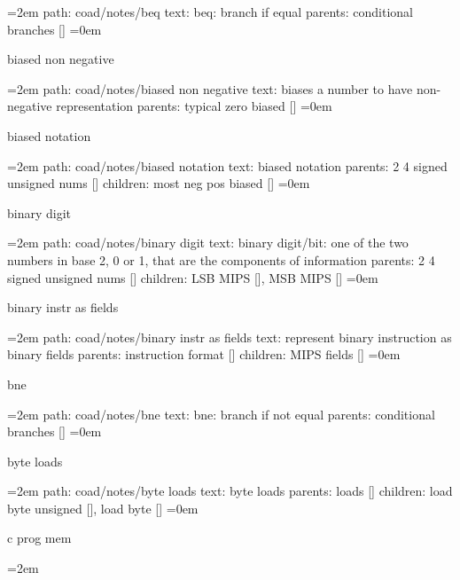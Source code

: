 \leftskip=2em
path: coad/notes/beq
\smallskip
text:  beq: branch if equal
\smallskip
parents:  conditional branches []
\smallskip
\leftskip=0em
\par\endgroup
\bigskip
{}
biased non negative
\smallskip
\par\begingroup
\leftskip=2em
path: coad/notes/biased non negative
\smallskip
text:  biases a number to have non-negative representation
\smallskip
parents:  typical zero biased []
\smallskip
\leftskip=0em
\par\endgroup
\bigskip
{}
biased notation
\smallskip
\par\begingroup
\leftskip=2em
path: coad/notes/biased notation
\smallskip
text:  biased notation
\smallskip
parents:  2 4 signed unsigned nums []
\smallskip
children: most neg pos biased []
\smallskip
\leftskip=0em
\par\endgroup
\bigskip
{}
binary digit
\smallskip
\par\begingroup
\leftskip=2em
path: coad/notes/binary digit
\smallskip
text:  binary digit/bit: one of the two numbers in base 2, 0 or 1, that are the components of information
\smallskip
parents:  2 4 signed unsigned nums []
\smallskip
children: LSB MIPS [], MSB MIPS []
\smallskip
\leftskip=0em
\par\endgroup
\bigskip
{}
binary instr as fields
\smallskip
\par\begingroup
\leftskip=2em
path: coad/notes/binary instr as fields
\smallskip
text:  represent binary instruction as binary fields
\smallskip
parents:  instruction format []
\smallskip
children: MIPS fields []
\smallskip
\leftskip=0em
\par\endgroup
\bigskip
{}
bne
\smallskip
\par\begingroup
\leftskip=2em
path: coad/notes/bne
\smallskip
text:  bne: branch if not equal
\smallskip
parents:  conditional branches []
\smallskip
\leftskip=0em
\par\endgroup
\bigskip
{}
byte loads
\smallskip
\par\begingroup
\leftskip=2em
path: coad/notes/byte loads
\smallskip
text:  byte loads
\smallskip
parents:  loads []
\smallskip
children: load byte unsigned [], load byte []
\smallskip
\leftskip=0em
\par\endgroup
\bigskip
{}
c prog mem
\smallskip
\par\begingroup
\leftskip=2em
